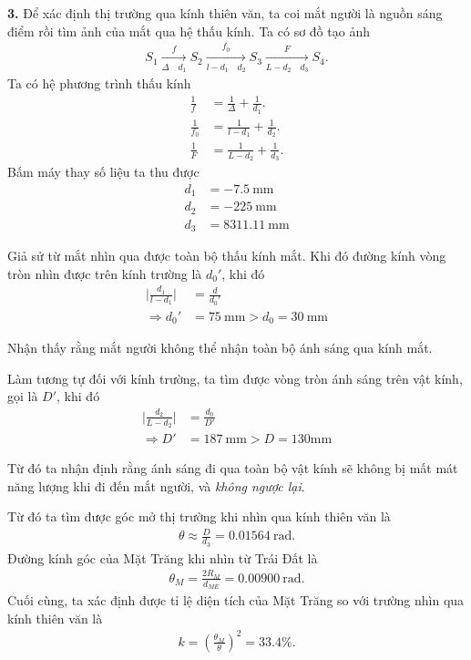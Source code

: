 \vspace{1mm}

\textbf{3.} Để xác định thị trường qua kính thiên văn, ta coi mắt người là nguồn sáng điểm rồi tìm ảnh của mắt qua hệ thấu kính. Ta có sơ đồ tạo ảnh
\begin{align}
     S_1 \xrightarrow[\displaystyle \Delta \quad d_1]{\displaystyle f} S_2 \xrightarrow[\displaystyle l - d_1 \quad d_2]{\displaystyle f_0} S_3 \xrightarrow[\displaystyle  L - d_2 \quad d_3]{\displaystyle F} S_4.
\end{align}
Ta có hệ phương trình thấu kính
\begin{align}
    \frac{1}{f} &= \frac{1}{\Delta} + \frac{1}{d_1}.\\
    \frac{1}{f_0} &= \frac{1}{l - d_1} + \frac{1}{d_2}.\\
    \frac{1}{F} &= \frac{1}{L - d_2} + \frac{1}{d_3}.
\end{align}
Bấm máy thay số liệu ta thu được
\begin{align}
    d_1 &= -7.5\mathrm{~mm}\\
    d_2 &= -225 \mathrm{~mm}\\
    d_3 &=8311.11 \mathrm{~mm}
\end{align}

Giả sử từ mắt nhìn qua được toàn bộ thấu kính mắt. Khi đó đường kính vòng tròn nhìn được trên kính trường là $d_0'$, khi đó
\begin{align}
    \Big| \frac{d_1}{l -d_1} \Big| &= \frac{d}{d_0'}\\
    \Rightarrow d_0' &= 75 \mathrm{~mm} > d_0 = 30 \mathrm{~mm}
\end{align}

Nhận thấy rằng mắt người không thể nhận toàn bộ ánh sáng qua kính mắt.

Làm tương tự đối với kính trường, ta tìm được vòng tròn ánh sáng trên vật kính, gọi là $D'$, khi đó
\begin{align}
    \Big|\frac{d_2}{L - d_2} \Big| &= \frac{d_0}{D'}\\
    \Rightarrow D' &= 187 \mathrm{~mm} > D =130 \mathrm{mm}
\end{align}

Từ đó ta nhận định rằng ánh sáng đi qua toàn bộ vật kính sẽ không bị mất mát năng lượng khi đi đến mắt người, và \textit{không ngược lại}.

\vspace{1mm}
Từ đó ta tìm được góc mở thị trường khi nhìn qua kính thiên văn là 
\begin{align}
    \theta \approx \frac{D}{d_3} = 0.01564\mathrm{~rad}.
\end{align}
Đường kính góc của Mặt Trăng khi nhìn từ Trái Đất là 
\begin{align}
    \theta_M = \frac{2R_M}{d_{ME}} = 0.00900 \mathrm{~rad}.
\end{align}
Cuối cùng, ta xác định được tỉ lệ diện tích của Mặt Trăng so với trường nhìn qua kính thiên văn là
\begin{align}
    k = \left( \frac{\theta_M}{\theta} \right)^2 = 33.4 \%.
\end{align}



